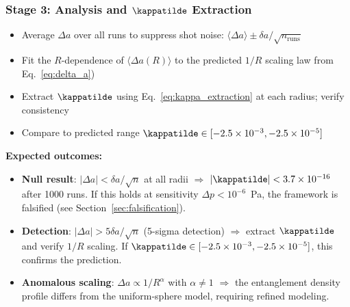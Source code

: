 \subsubsection{Stage 3: Analysis and $\kappatilde$ Extraction}

\begin{itemize}
    \item Average $\Delta a$ over all runs to suppress shot noise:
    $\langle\Delta a\rangle \pm \delta a/\sqrt{n_{\mathrm{runs}}}$
    \item Fit the $R$-dependence of $\langle\Delta a(R)\rangle$ to the
    predicted $1/R$ scaling law from Eq.~\eqref{eq:delta_a})
    \item Extract $\kappatilde$ using Eq.~\eqref{eq:kappa_extraction}
    at each radius; verify consistency
    \item Compare to predicted range $\kappatilde \in
    [-2.5\times10^{-3}, -2.5\times10^{-5}]$
\end{itemize}

\noindent\textbf{Expected outcomes:}
\begin{itemize}
    \item \textbf{Null result}: $|\Delta a| < \delta a/\sqrt{n}$ at
    all radii $\Rightarrow$ $|\kappatilde| < 3.7\times10^{-16}$ after
    1000 runs. If this holds at sensitivity $\Delta p < 10^{-6}$~Pa,
    the framework is falsified (see Section~\ref{sec:falsification}).
    \item \textbf{Detection}: $|\Delta a| > 5\delta a/\sqrt{n}$
    (5-sigma detection) $\Rightarrow$ extract $\kappatilde$ and verify
    $1/R$ scaling. If $\kappatilde \in [-2.5\times10^{-3},-2.5\times10^{-5}]$,
    this confirms the prediction.
    \item \textbf{Anomalous scaling}: $\Delta a \propto 1/R^\alpha$
    with $\alpha \neq 1$ $\Rightarrow$ the entanglement density profile
    differs from the uniform-sphere model, requiring refined modeling.
\end{itemize}
